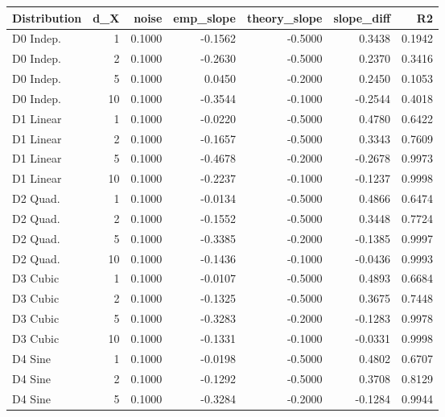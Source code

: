 
\begin{tabular}{lrrrrrr}
\toprule
Distribution &  d\_X &  noise &  emp\_slope &  theory\_slope &  slope\_diff &     R2 \\
\midrule
   D0 Indep. &    1 & 0.1000 &    -0.1562 &       -0.5000 &      0.3438 & 0.1942 \\
   D0 Indep. &    2 & 0.1000 &    -0.2630 &       -0.5000 &      0.2370 & 0.3416 \\
   D0 Indep. &    5 & 0.1000 &     0.0450 &       -0.2000 &      0.2450 & 0.1053 \\
   D0 Indep. &   10 & 0.1000 &    -0.3544 &       -0.1000 &     -0.2544 & 0.4018 \\
   D1 Linear &    1 & 0.1000 &    -0.0220 &       -0.5000 &      0.4780 & 0.6422 \\
   D1 Linear &    2 & 0.1000 &    -0.1657 &       -0.5000 &      0.3343 & 0.7609 \\
   D1 Linear &    5 & 0.1000 &    -0.4678 &       -0.2000 &     -0.2678 & 0.9973 \\
   D1 Linear &   10 & 0.1000 &    -0.2237 &       -0.1000 &     -0.1237 & 0.9998 \\
    D2 Quad. &    1 & 0.1000 &    -0.0134 &       -0.5000 &      0.4866 & 0.6474 \\
    D2 Quad. &    2 & 0.1000 &    -0.1552 &       -0.5000 &      0.3448 & 0.7724 \\
    D2 Quad. &    5 & 0.1000 &    -0.3385 &       -0.2000 &     -0.1385 & 0.9997 \\
    D2 Quad. &   10 & 0.1000 &    -0.1436 &       -0.1000 &     -0.0436 & 0.9993 \\
    D3 Cubic &    1 & 0.1000 &    -0.0107 &       -0.5000 &      0.4893 & 0.6684 \\
    D3 Cubic &    2 & 0.1000 &    -0.1325 &       -0.5000 &      0.3675 & 0.7448 \\
    D3 Cubic &    5 & 0.1000 &    -0.3283 &       -0.2000 &     -0.1283 & 0.9978 \\
    D3 Cubic &   10 & 0.1000 &    -0.1331 &       -0.1000 &     -0.0331 & 0.9998 \\
     D4 Sine &    1 & 0.1000 &    -0.0198 &       -0.5000 &      0.4802 & 0.6707 \\
     D4 Sine &    2 & 0.1000 &    -0.1292 &       -0.5000 &      0.3708 & 0.8129 \\
     D4 Sine &    5 & 0.1000 &    -0.3284 &       -0.2000 &     -0.1284 & 0.9944 \\

\end{tabular}
